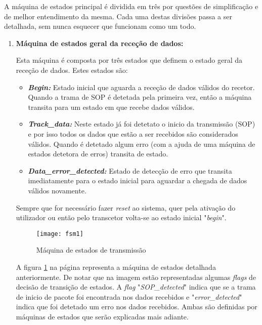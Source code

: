 A máquina de estados principal é dividida em três por questões de simplificação e de melhor entendimento da mesma. Cada uma destas divisões passa a ser detalhada, sem nunca esquecer que funcionam como um todo.

\begin{enumerate}
	\item \textbf{Máquina de estados geral da receção de dados:}
	
	Esta máquina é composta por três estados que definem o estado geral da receção de dados. Estes estados são:
	\begin{itemize}
		\item \textbf{\textit{Begin:}} Estado inicial que aguarda a receção de dados válidos do recetor. Quando a trama de SOP é detetada pela primeira vez, então a máquina transita para um estado em que recebe dados válidos. 
		
		\item \textbf{\textit{Track\_data:}} Neste estado já foi detetato o inicio da transmissão (SOP) e por isso todos os dados que estão a ser recebidos são considerados válidos. Quando é detetado algum erro (com a ajuda de uma máquina de estados detetora de erros) transita de estado.
		
		\item \textbf{\textit{Data\_error\_detected:} }Estado de detecção de erro que transita imediatamente para o estado inicial para aguardar a chegada de dados válidos novamente.
	\end{itemize}

	Sempre que for necessário fazer \textit{reset} ao sistema, quer pela ativação do utilizador ou então pelo transcetor volta-se ao estado inicial "\textit{begin}".
	
	
	\begin{figure}[h!]
		\begin{center}
			\leavevmode
			\texttt{[image: fsm1]}
			\captionsetup{width=1.0\linewidth}
			\caption[Máquina de estados de transmissão]{Máquina de estados de transmissão}
			\label{fig:FSM1}
	\end{center}
	\end{figure}
	
	A figura \ref{fig:FSM1} na página \pageref{fig:FSM1} representa a máquina de estados detalhada anteriormente. De notar que na imagem estão representadas algumas \textit{flags} de decisão de transição de estados. A \textit{flag} "\textit{SOP\_detected}" indica que se a trama de inicio de pacote foi encontrada nos dados recebidos e "\textit{error\_detected}" indica que foi detetado um erro nos dados recebidos. Ambas são definidas por máquinas de estados que serão explicadas mais adiante.
	

\end{enumerate}
